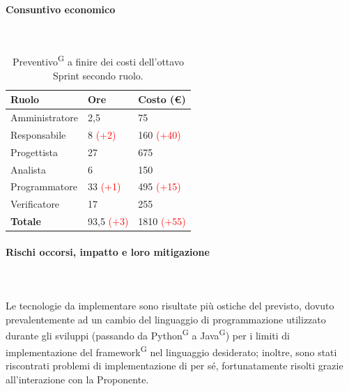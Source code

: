 \documentclass[8pt]{article}
\newcommand{\glossterm}[1]{#1\textsuperscript{G}} %
\newcommand{\subsubsubsection}[1]{\paragraph{#1}\mbox{}\\}
\begin{document}
\subsubsubsection{Consuntivo economico}
\begin{table}[ht!]
    \centering
    \begin{tabular}{p{4cm} p{1.8cm} p{2.2cm}}
        \toprule
        \textbf{Ruolo} & \textbf{Ore} & \textbf{Costo (€)} \\
        \midrule
        Amministratore & 2,5 & 75 \\ 
        Responsabile & 8 \textcolor{red}{(+2)} & 160 \textcolor{red}{(+40)} \\ 
        Progettista & 27 & 675 \\ 
        Analista & 6 & 150 \\ 
        Programmatore & 33 \textcolor{red}{(+1)} & 495 \textcolor{red}{(+15)} \\ 
        Verificatore & 17 & 255 \\ 
        \midrule
        \textbf{Totale} & 93,5 \textcolor{red}{(+3)} & 1810 \textcolor{red}{(+55)} \\ 
        \bottomrule 
    \end{tabular}
    \caption{\glossterm{Preventivo} a finire dei costi dell'ottavo Sprint secondo ruolo.}
    \label{table:Preventivo a finire dei costi dell'ottavo Sprint secondo ruolo}
\end{table}
\subsubsubsection{Rischi occorsi, impatto e loro mitigazione} \\
Le tecnologie da implementare sono risultate più ostiche del previsto, dovuto prevalentemente ad un cambio del linguaggio di programmazione utilizzato durante gli sviluppi (passando da \glossterm{Python} a \glossterm{Java}) per i limiti di implementazione del \glossterm{framework} nel linguaggio desiderato; inoltre, sono stati riscontrati problemi di implementazione di per sé, fortunatamente risolti grazie all'interazione con la Proponente.
\end{document}
